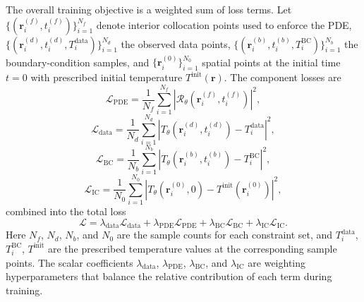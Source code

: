 \documentclass[11pt,letterpaper]{article}
\begin{document}
The overall training objective is a weighted sum of loss terms. Let
$\{(\mathbf{r}_i^{(f)},t_i^{(f)})\}_{i=1}^{N_f}$ denote interior collocation points used to
enforce the PDE, $\{(\mathbf{r}_i^{(d)},t_i^{(d)},T_i^{\mathrm{data}})\}_{i=1}^{N_d}$ the
observed data points, $\{(\mathbf{r}_i^{(b)},t_i^{(b)},T_i^{\mathrm{BC}})\}_{i=1}^{N_b}$ the
boundary-condition samples, and $\{\mathbf{r}_i^{(0)}\}_{i=1}^{N_0}$ spatial points at the
initial time $t=0$ with prescribed initial temperature $T^{\mathrm{init}}(\mathbf{r})$. The
component losses are
\begin{equation}
\mathcal{L}_{\mathrm{PDE}}
=
\frac{1}{N_f}\sum_{i=1}^{N_f}
\left|\mathcal{R}_\theta(\mathbf{r}_i^{(f)},t_i^{(f)})\right|^2,
\end{equation}
\begin{equation}
\mathcal{L}_{\mathrm{data}}
=
\frac{1}{N_d}\sum_{i=1}^{N_d}
\left|T_\theta(\mathbf{r}_i^{(d)},t_i^{(d)})-T_i^{\mathrm{data}}\right|^2,
\end{equation}
\begin{equation}
\mathcal{L}_{\mathrm{BC}}
=
\frac{1}{N_b}\sum_{i=1}^{N_b}
\left|T_\theta(\mathbf{r}_i^{(b)},t_i^{(b)})-T_i^{\mathrm{BC}}\right|^2,
\end{equation}
\begin{equation}
\mathcal{L}_{\mathrm{IC}}
=
\frac{1}{N_0}\sum_{i=1}^{N_0}
\left|T_\theta(\mathbf{r}_i^{(0)},0)-T^{\mathrm{init}}(\mathbf{r}_i^{(0)})\right|^2,
\end{equation}
combined into the total loss
\begin{equation}
\mathcal{L}
=
\lambda_{\mathrm{data}}\mathcal{L}_{\mathrm{data}}
+
\lambda_{\mathrm{PDE}}\mathcal{L}_{\mathrm{PDE}}
+
\lambda_{\mathrm{BC}}\mathcal{L}_{\mathrm{BC}}
+
\lambda_{\mathrm{IC}}\mathcal{L}_{\mathrm{IC}}.
\end{equation}
Here $N_f$, $N_d$, $N_b$, and $N_0$ are the sample counts for each constraint set, and
$T_i^{\mathrm{data}}$, $T_i^{\mathrm{BC}}$, $T^{\mathrm{init}}$ are the prescribed temperature
values at the corresponding sample points. The scalar coefficients $\lambda_{\mathrm{data}}$,
$\lambda_{\mathrm{PDE}}$, $\lambda_{\mathrm{BC}}$, and $\lambda_{\mathrm{IC}}$ are weighting
hyperparameters that balance the relative contribution of each term during training.
\end{document}
